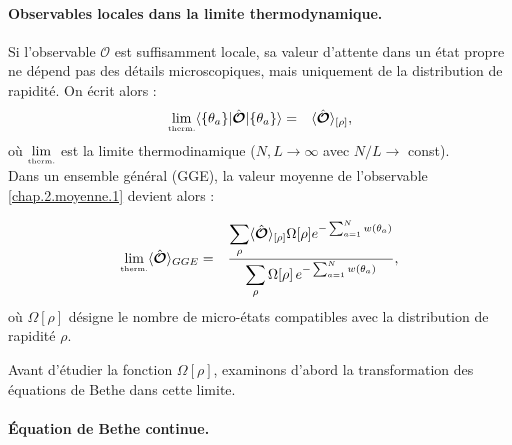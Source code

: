 \paragraph{Observables locales dans la limite thermodynamique.}
Si l’observable $\mathcal{O}$ est suffisamment locale, sa valeur d’attente dans un état propre ne dépend pas des détails microscopiques, mais uniquement de la distribution de rapidité. On écrit alors :
\begin{eqnarray}
	\underset{\mbox{\tiny therm.}}{\lim} \langle  \{ \theta_a\}  \vert   \hat{\bm{\mathcal{O}}} \vert \{ \theta_a\} \rangle & = & \langle \hat{\bm{\mathcal{O}}}\rangle_{[\rho]},
\end{eqnarray}
où $\underset{\mbox{\tiny therm.}}{\lim}$ est la limite thermodinamique ($N,L \to \infty$ avec $N/L \to $ const).\\

\medskip
Dans un ensemble général (GGE), la valeur moyenne de l’observable \eqref{chap.2.moyenne.1} devient alors :	
	
\begin{eqnarray}\label{chap.2.moyenne.2}
	\underset{\mbox{\tiny therm.}}{\lim} \langle \hat{\bm{\mathcal{O}}} \rangle_{GGE} & =  & \frac{  \displaystyle \sum_{\rho }  \langle \hat{\bm{\mathcal{O}}}\rangle_{[\rho]} \Omega[\rho] e^{- \sum_{a = 1}^N  w(\theta_a)    }}{ \displaystyle \sum_{\rho }   \Omega[\rho]\,e^{- \sum_{a = 1}^N  w(\theta_a) } } ,
\end{eqnarray}
où $\Omega[\rho]$ désigne le nombre de micro-états compatibles avec la distribution de rapidité $\rho$.

\medskip
Avant d’étudier la fonction $\Omega[\rho]$, examinons d’abord la transformation des équations de Bethe dans cette limite.


\paragraph{Équation de Bethe continue.}

